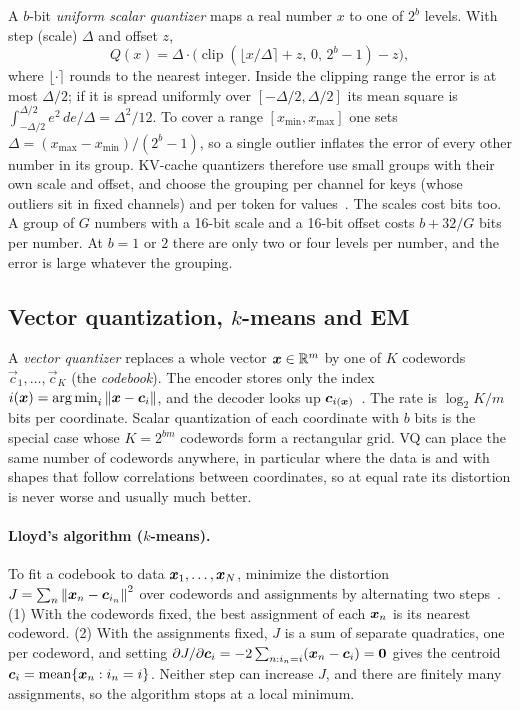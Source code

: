A $b$-bit \emph{uniform scalar quantizer} maps a real number $x$ to one of $2^b$ levels. With step
(scale) $\Delta$ and offset $z$,
\begin{equation}\label{eq:c13-sq}
  Q(x) = \Delta\cdot\bigl(\operatorname{clip}(\lfloor x/\Delta\rceil+z,\,0,\,2^b-1)-z\bigr),
\end{equation}
where $\lfloor\cdot\rceil$ rounds to the nearest integer. Inside the clipping range the error is at most
$\Delta/2$; if it is spread uniformly over $[-\Delta/2,\Delta/2]$ its mean square is
$\int_{-\Delta/2}^{\Delta/2}e^2\,de/\Delta=\Delta^2/12$. To cover a range $[x_{\min},x_{\max}]$ one sets
$\Delta=(x_{\max}-x_{\min})/(2^b-1)$, so a single outlier inflates the error of every other number in
its group. KV-cache quantizers therefore use small groups with their own scale and offset, and choose
the grouping per channel for keys (whose outliers sit in fixed channels) and per token for
values~\citep{c13-liu2024kivi}. The scales cost bits too. A group of $G$ numbers with a 16-bit scale
and a 16-bit offset costs $b+32/G$ bits per number. At $b=1$ or $2$ there are only two or four levels
per number, and the error is large whatever the grouping.

\subsection{Vector quantization, \texorpdfstring{$k$}{k}-means and EM}\label{sec:c13-vq}

A \emph{vector quantizer} replaces a whole vector $\bm{x}\in\mathbb{R}^m$ by one of $K$ codewords
$\vec{c}_1,\dots,\vec{c}_K$ (the \emph{codebook}). The encoder stores only the index
$i(\bm{x})=\operatorname*{arg\,min}_i\left\lVert \bm{x}-\bm{c}_i\right\rVert$, and the decoder looks up $\bm{c}_{i(\bm{x})}$~\citep{c13-gray1984vq}.
The rate is $\log_2K/m$ bits per coordinate. Scalar quantization of each coordinate with $b$ bits is the
special case whose $K=2^{bm}$ codewords form a rectangular grid. VQ can place the same number of
codewords anywhere, in particular where the data is and with shapes that follow correlations between
coordinates, so at equal rate its distortion is never worse and usually much better.

\paragraph{Lloyd's algorithm ($k$-means).} To fit a codebook to data $\bm{x}_1,\dots,\bm{x}_N$, minimize the
distortion $J=\sum_n\left\lVert \bm{x}_n-\bm{c}_{i_n}\right\rVert^2$ over codewords and assignments by alternating two
steps~\citep{c13-lloyd1982}. (1) With the codewords fixed, the best assignment of each $\bm{x}_n$ is its
nearest codeword. (2) With the assignments fixed, $J$ is a sum of separate quadratics, one per codeword,
and setting $\partial J/\partial\bm{c}_i=-2\sum_{n:i_n=i}(\bm{x}_n-\bm{c}_i)=\bm{0}$ gives the centroid
$\bm{c}_i=\text{mean}\{\bm{x}_n:i_n=i\}$. Neither step can increase $J$, and there are finitely many
assignments, so the algorithm stops at a local minimum.

